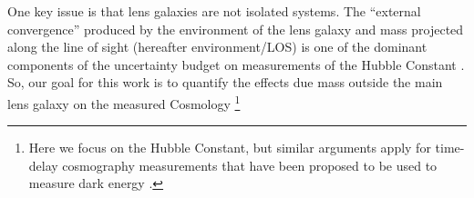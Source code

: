 One key issue is that lens galaxies are not isolated systems. The ``external convergence'' produced by the environment of the lens galaxy and mass projected along the line of sight (hereafter environment/LOS) is one of the dominant components of the uncertainty budget on measurements of the Hubble Constant \citep{Suyu12}. So, our goal for this work is to quantify the effects due mass outside the main lens galaxy on the measured Cosmology \footnote{Here we focus on the Hubble Constant, but similar arguments apply for time-delay cosmography measurements that have been proposed to be used to measure dark energy \citep{Treu13}.}